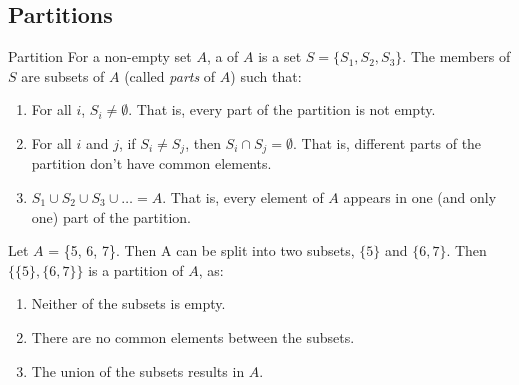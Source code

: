 \documentclass[\main/notes.tex]{subfiles}
\begin{document}
			\subsection{Partitions}
				\begin{definition}{Partition}
					For a non-empty set $A$, a  of $A$ is a set $S = \{S_{1}, S_{2}, S_{3}\}$. The members of $S$ are subsets of $A$ (called \emph{parts} of $A$) such that:
					\begin{enumerate}
						\item For all $i$, $S_{i} \neq \emptyset$. That is, every part of the partition is not empty.
						\item For all $i$ and $j$, if $S_{i} \neq S_{j}$, then $S_{i} \cap S_{j} = \emptyset$. That is, different parts of the partition don't have common elements.
						\item $S_{1} \cup S_{2} \cup S_{3} \cup \ldots = A$. That is, every element of $A$ appears in one (and only one) part of the partition.
					\end{enumerate}
				\end{definition}
				\begin{example}
					Let $A$ = \{5, 6, 7\}. Then A can be split into two subsets, $\{5\}$ and $\{6, 7\}$. Then $\bigl\{\{5\}, \{6, 7\}\bigr\}$ is a partition of $A$, as:
					\begin{enumerate}
						\item Neither of the subsets is empty.
						\item There are no common elements between the subsets.
						\item The union of the subsets results in $A$.
					\end{enumerate}
				\end{example}
\end{document}
